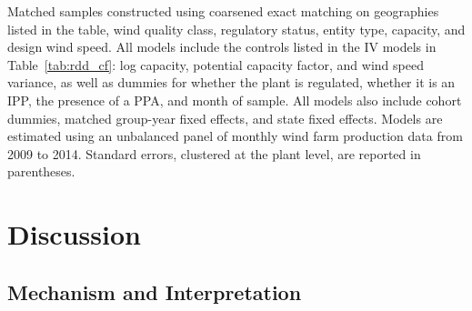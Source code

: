 \documentclass[12pt]{article}
\begin{document}
\begin{table}[H]
\begin{center}
\caption{Sensitivity of Matching Estimates to Geographic Restrictions \label{tab:matching_table_cf}}

\end{center}
\footnotesize
Matched samples constructed using coarsened exact matching on geographies listed in the table, wind quality class, regulatory status, entity type, capacity, and design wind speed. All models include the controls listed in the IV models in Table~\ref{tab:rdd_cf}: log capacity, potential capacity factor, and wind speed variance, as well as dummies for whether the plant is regulated, whether it is an IPP, the presence of a PPA, and month of sample. All models also include cohort dummies, matched group-year fixed effects, and state fixed effects. Models are estimated using an unbalanced panel of monthly wind farm production data from 2009 to 2014. Standard errors, clustered at the plant level, are reported in parentheses.
\end{table}

\section{Discussion \label{sec:Discussion}}


\subsection{Mechanism and Interpretation \label{sec:Mechanism}}
\end{document}
